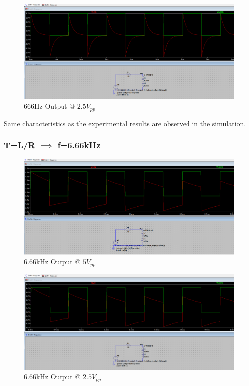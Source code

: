 \begin{figure}[h]
    \centering
    \includegraphics[width=1\textwidth]{assets/666-hz-2.5vpp-sim.png}
    \caption{666Hz Output @ $2.5V_{pp}$}
    \label{fig:666-hz-2.5vpp-output}
\end{figure}

Same characteristics as the experimental results are observed in the simulation.

\newpage{}
\thispagestyle{plain}

\subsubsection{T=L/R $\implies$ f=6.66kHz}

\begin{figure}[h]
    \centering
    \includegraphics[width=1\textwidth]{assets/6666-hz-5vpp-sim.png}
    \caption{6.66kHz Output @ $5V_{pp}$}
    \label{fig:6666-hz-5vpp-output}
\end{figure}

\begin{figure}[h]
    \centering
    \includegraphics[width=1\textwidth]{assets/6666-hz-2.5vpp-sim.png}
    \caption{6.66kHz Output @ $2.5V_{pp}$}
    \label{fig:6666-hz-2.5vpp-output}
\end{figure}

